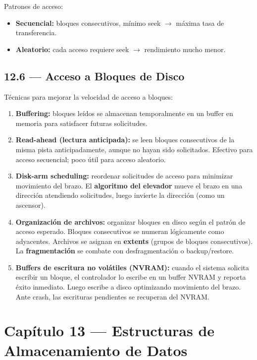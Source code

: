 \documentclass[11pt, a4paper]{article}
\begin{document}
Patrones de acceso:
\begin{itemize}[nosep]
	\item \textbf{Secuencial:} bloques consecutivos, mínimo seek $\rightarrow$ máxima tasa de transferencia.
	\item \textbf{Aleatorio:} cada acceso requiere seek $\rightarrow$ rendimiento mucho menor.
\end{itemize}

\subsection{12.6 --- Acceso a Bloques de Disco}

Técnicas para mejorar la velocidad de acceso a bloques:

\begin{enumerate}[nosep]
	\item \textbf{Buffering:} bloques leídos se almacenan temporalmente en un buffer en memoria para satisfacer futuras solicitudes.
	\item \textbf{Read-ahead (lectura anticipada):} se leen bloques consecutivos de la misma pista anticipadamente, aunque no hayan sido solicitados. Efectivo para acceso secuencial; poco útil para acceso aleatorio.
	\item \textbf{Disk-arm scheduling:} reordenar solicitudes de acceso para minimizar movimiento del brazo. El \textbf{algoritmo del elevador} mueve el brazo en una dirección atendiendo solicitudes, luego invierte la dirección (como un ascensor).
	\item \textbf{Organización de archivos:} organizar bloques en disco según el patrón de acceso esperado. Bloques consecutivos se numeran lógicamente como adyacentes. Archivos se asignan en \textbf{extents} (grupos de bloques consecutivos). La \textbf{fragmentación} se combate con desfragmentación o backup/restore.
	\item \textbf{Buffers de escritura no volátiles (NVRAM):} cuando el sistema solicita escribir un bloque, el controlador lo escribe en un buffer NVRAM y reporta éxito inmediato. Luego escribe a disco optimizando movimiento del brazo. Ante crash, las escrituras pendientes se recuperan del NVRAM.
\end{enumerate}

\section{Capítulo 13 --- Estructuras de Almacenamiento de Datos}
\end{document}
